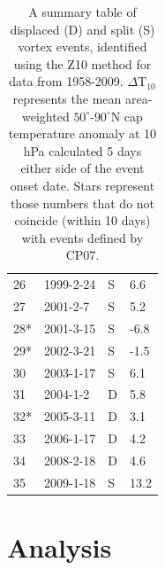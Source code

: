 \begin{table}
\begin{centering}
\begin{tabular}{|l|l|l|l|}
    26  & 1999-2-24   & S          & 6.6         \\
    27  & 2001-2-7    & S          & 5.2         \\
    28* & 2001-3-15   & S          & -6.8        \\
    29* & 2002-3-21   & S          & -1.5        \\
    30  & 2003-1-17   & S          & 6.1         \\
    31  & 2004-1-2    & D          & 5.8         \\
    32* & 2005-3-11   & D          & 3.1         \\
    33  & 2006-1-17   & D          & 4.2         \\
    34  & 2008-2-18   & D          & 4.6         \\
    35  & 2009-1-18   & S          & 13.2        \\ \hline
    \end{tabular}
    \caption{A summary table of displaced (D) and split (S) vortex events,
      identified using the Z10 method for data from 1958-2009.
      $\Delta \mathrm{T}_{10}$ represents the mean area-weighted
      $50^{\circ}$-$90^{\circ}$N cap temperature anomaly at 10 hPa calculated 5
      days either side of the event onset date. Stars represent those numbers
      that do not coincide (within 10 days) with events defined by CP07.}
\end{centering}
\label{tab:events}
\end{table}

\section{Analysis}

